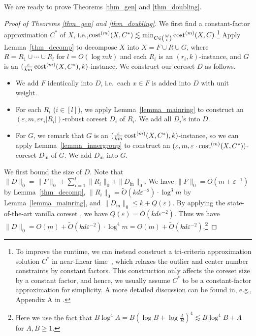 \documentclass[11pt,letterpaper]{article}
\theoremstyle{definition}
\newcommand{\eps}{\varepsilon}
\newcommand{\inn}{{\mathrm{in}}}
\begin{document}
We are ready to prove Theorems \ref{thm_gen} and \ref{thm_doubling}.

\begin{proof}[Proof of Theorems \ref{thm_gen} and \ref{thm_doubling}]
We first find a constant-factor approximation $C^\ast$ of $X$, i.e.,\linebreak $\cost^{(m)}(X,C^\ast) \lesssim \min_{C\in \binom{M}{k}} \cost^{(m)}(X,C)$.\footnote{To improve the runtime, we can instead construct a tri-criteria approximation solution $C^\ast$ in near-linear time~\cite{bhaskara2019greedy}, which relaxes the outlier and center number constraints by constant factors. This construction only affects the coreset size by a constant factor, and hence, we usually assume $C^\ast$ to be a constant-factor approximation for simplicity. A more detailed discussion can be found in, e.g., Appendix A in \cite{huang2025coresets}.}
%
Apply Lemma~\ref{thm_decomp} to decompose $X$ into $X=F\cup R\cup G$, where $R=R_1\cup\cdots\cup R_l$ for $l=O(\log mk)$ and each $R_i$ is an $(r_i,k)$-instance, and $G$ is an $(\frac{\eps}{km}\cost^{(m)}(X,C^\ast),k)$-instance. We construct our coreset $D$ as follows.
	
	\begin{itemize}[itemsep=0pt]
		\item We add $F$ identically into $D$, i.e.\ each $x\in F$ is added into $D$ with unit weight.
		\item For each $R_i$ ($i\in [l]$), we apply Lemma~\ref{lemma_mainring} to construct an $(\eps,m,\eps r_i |R_i|)$-robust coreset $D_i$ of $R_i$. We add all $D_i$'s into $D$.
		\item For $G$, we remark that $G$ is an $(\frac{\eps}{km}\cost^{(m)}(X,C^\ast),k)$-instance, so we can apply Lemma~\ref{lemma_innergroup} to construct an $(\eps,m,\eps\cdot \cost^{(m)}(X,C^\ast))$-coreset $D_{\inn}$ of $G$. We add $D_{\inn}$ into $G$.
	\end{itemize}
	
	We first bound the size of $D$. Note that $\|D\|_0=\|F\|_0+\sum_{i=1}^l \|R_i\|_0+\|D_{\inn}\|_0$. We have $\|F\|_0 = O(m+\eps^{-1})$ by Lemma~\ref{thm_decomp}, $\|R_i\|_0 = \tilde{O}(kd\eps^{-2})\cdot \log^3 m$ by Lemma~\ref{lemma_mainring}, and $\|D_{\inn}\|_0\leq k+Q(\eps)$. By applying the state-of-the-art vanilla coreset \cite{Cohen25}, we have $Q(\eps) = \tilde{O}(kd\eps^{-2})$. Thus we have $\|D\|_0 = O(m)+\tilde{O}(kd\eps^{-2})\cdot \log^4 m = O(m) + \tilde{O}(kd\eps^{-2})$.\footnote{Here we use the fact that $B\log^4 A = B(\log B + \log\frac{A}{B})^4\lesssim B\log^4 B + A$ for $A,B\geq 1$.}
	

\end{proof}
\end{document}

